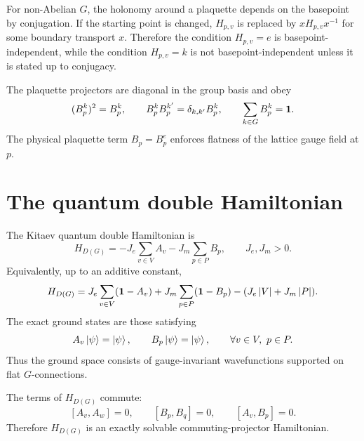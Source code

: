 \begin{remark}
For non-Abelian \(G\), the holonomy around a plaquette depends on the basepoint
by conjugation.  If the starting point is changed, \(H_{p,v}\) is replaced by
\(xH_{p,v}x^{-1}\) for some boundary transport \(x\).  Therefore the condition
\(H_{p,v}=e\) is basepoint-independent, while the condition \(H_{p,v}=k\) is not
basepoint-independent unless it is stated up to conjugacy.
\end{remark}

The plaquette projectors are diagonal in the group basis and obey
\begin{equation}
\label{eq:plaquette-projector-algebra}
    (B_p^k)^2=B_p^k,
    \qquad
    B_p^kB_p^{k'}=\delta_{k,k'}B_p^k,
    \qquad
    \sum_{k\in G}B_p^k=\mathbf{1} .
\end{equation}
The physical plaquette term \(B_p=B_p^e\) enforces flatness of the lattice gauge
field at \(p\).

\section{The quantum double Hamiltonian}
\label{sec:quantum-double-hamiltonian}

The Kitaev quantum double Hamiltonian is
\begin{equation}
\label{eq:quantum-double-hamiltonian}
    H_{D(G)}
    =
    -J_e\sum_{v\in V}A_v
    -J_m\sum_{p\in P}B_p,
    \qquad
    J_e,J_m>0 .
\end{equation}
Equivalently, up to an additive constant,
\begin{equation}
\label{eq:quantum-double-projector-form}
    H_{D(G)}
    =
    J_e\sum_{v\in V}(\mathbf{1}-A_v)
    +J_m\sum_{p\in P}(\mathbf{1}-B_p)
    -(J_e\left|V\right|+J_m\left|P\right|) .
\end{equation}
The exact ground states are those satisfying
\begin{equation}
\label{eq:quantum-double-ground-state-conditions}
    A_v\left|\psi\right\rangle=\left|\psi\right\rangle,
    \qquad
    B_p\left|\psi\right\rangle=\left|\psi\right\rangle,
    \qquad
    \forall v\in V,\ p\in P .
\end{equation}
Thus the ground space consists of gauge-invariant wavefunctions supported on
flat \(G\)-connections.

\begin{theorem}
The terms of \(H_{D(G)}\) commute:
\begin{equation}
\label{eq:quantum-double-commuting-projectors}
    [A_v,A_w]=0,
    \qquad
    [B_p,B_q]=0,
    \qquad
    [A_v,B_p]=0 .
\end{equation}
Therefore \(H_{D(G)}\) is an exactly solvable commuting-projector Hamiltonian.
\end{theorem}

